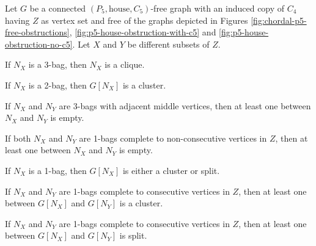 \begin{lemma}
    Let $G$ be a connected $(P_5,\text{house},C_5)$-free graph with an induced
    copy of $C_4$ having $Z$ as vertex set and free of the graphs depicted in
    Figures \ref{fig:chordal-p5-free-obstructions},
    \ref{fig:p5-house-obstruction-with-c5} and
    \ref{fig:p5-house-obstruction-no-c5}. Let $X$ and $Y$ be different subsets
    of $Z$.
    \begin{lemenum}
        \item If $N_X$ is a 3-bag, then $N_X$ is a clique.
            \label{lem:type_3}
        \item If $N_X$ is a 2-bag, then $G[N_X]$ is a cluster.
            \label{lem:type_4}
        \item If $N_X$ and $N_Y$ are 3-bags with adjacent middle vertices, then
            at least one between $N_X$ and $N_Y$ is empty. \label{lem:type_5}
        \item If both $N_X$ and $N_Y$ are 1-bags complete to non-consecutive
            vertices in $Z$, then at least one between $N_X$ and $N_Y$ is empty.
            \label{lem:type_6}
        \item If $N_X$ is a 1-bag, then $G[N_X]$ is either a cluster or split.
            \label{lem:type_7}
        \item If $N_X$ and $N_Y$ are 1-bags complete to consecutive vertices in
            $Z$, then at least one between $G[N_X]$ and $G[N_Y]$ is a cluster.
            \label{lem:type_12}
        \item If $N_X$ and $N_Y$ are 1-bags complete to consecutive vertices in
            $Z$, then at least one between $G[N_X]$ and $G[N_Y]$ is split.
            \label{lem:type_13}
    \end{lemenum}
\end{lemma}

